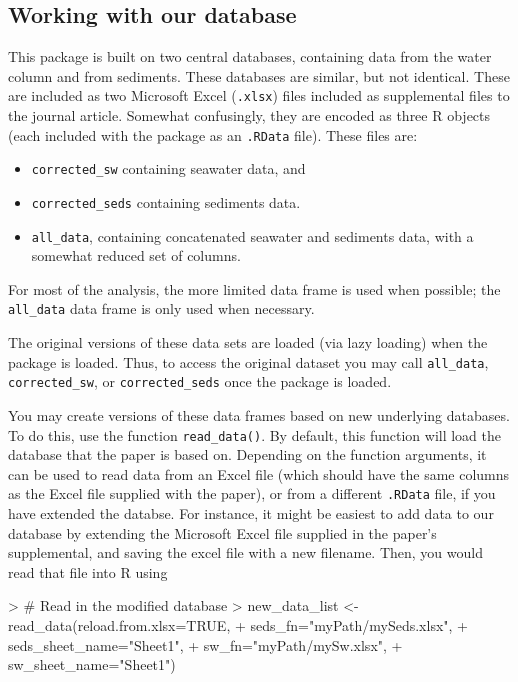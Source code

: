 \documentclass{article}
\begin{document}
\subsection{Working with our database}

This package is built on two central databases, containing data from the water column and from sediments. These databases are similar, but not identical. These are included as two Microsoft Excel (\texttt{.xlsx}) files included as supplemental files to the journal article. Somewhat confusingly, they are encoded as three R objects (each included with the package as an \texttt{.RData} file). These files are:

\begin{itemize}
  \item \texttt{corrected\_sw} containing seawater data, and
  \item \texttt{corrected\_seds} containing sediments data.
  \item \texttt{all\_data}, containing concatenated seawater and sediments data, with a somewhat reduced set of columns. 
\end{itemize}

For most of the analysis, the more limited data frame is used when possible; the \texttt{all\_data} data frame is only used when necessary.

The original versions of these data sets are loaded (via lazy loading) when the package is loaded. Thus, to access the original dataset you may call \texttt{all\_data}, \texttt{corrected\_sw}, or \texttt{corrected\_seds} once the package is loaded. 

You may create versions of these data frames based on new underlying databases. To do this, use the function \texttt{read\_data()}. By default, this function will load the database that the paper is based on. Depending on the function arguments, it can be used to read data from an Excel file (which should have the same columns as the Excel file supplied with the paper), or from a different \texttt{.RData} file, if you have extended the databse. For instance, it might be easiest to add data to our database by extending the Microsoft Excel file supplied in the paper's supplemental, and saving the excel file with a new filename. Then, you would read that file into R using

\begin{Schunk}
\begin{Sinput}
> # Read in the modified database
> new_data_list <- read_data(reload.from.xlsx=TRUE, 
+                            seds_fn="myPath/mySeds.xlsx", 
+                            seds_sheet_name="Sheet1",
+                            sw_fn="myPath/mySw.xlsx", 
+                            sw_sheet_name="Sheet1")
\end{Sinput}
\end{Schunk}
\end{document}
